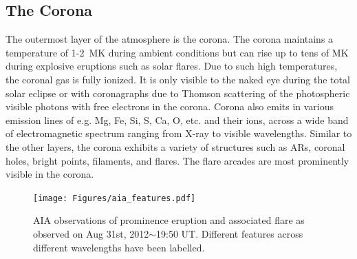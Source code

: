 \subsection{The Corona}\label{corona}

The outermost layer of the atmosphere is the corona. The corona maintains a temperature of 1-2~MK during ambient conditions but can rise up to tens of MK during explosive eruptions such as solar flares. Due to such high temperatures, the coronal gas is fully ionized. It is only visible to the naked eye during the total solar eclipse or with coronagraphs due to Thomson scattering of the photospheric visible photons with free electrons in the corona. Corona also emits in various emission lines of e.g. Mg, Fe, Si, S, Ca, O, etc. and their ions, across a wide band of electromagnetic spectrum ranging from X-ray to visible wavelengths. Similar to the other layers, the corona exhibits a variety of structures such as ARs, coronal holes, bright points, filaments, and flares. The flare arcades are most prominently visible in the corona. %

\begin{figure}[ht!]
    \centering
    \texttt{[image: Figures/aia\_features.pdf]}
    \caption[Different parts of a flare eruption observed across various wavelengths]{AIA observations of prominence eruption and associated flare as observed on Aug 31st, 2012$\sim$19:50 UT. Different features across different wavelengths have been labelled.}
    \label{fig:aia-feature}
\end{figure}




